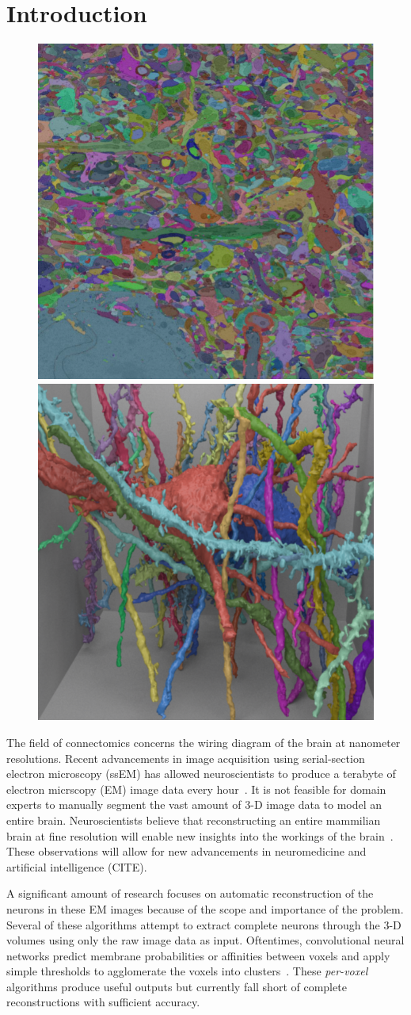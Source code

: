 \section{Introduction}

\begin{figure}
	\centering
	\includegraphics[width=0.42\linewidth]{./figures/intro-slice.png}
	\hspace{0.085\linewidth}
	\includegraphics[width=0.42\linewidth]{./figures/intro-cube.png}
\end{figure}

The field of connectomics concerns the wiring diagram of the brain at nanometer resolutions. 
Recent advancements in image acquisition using serial-section electron microscopy (ssEM) has allowed neuroscientists to produce a terabyte of electron micrscopy (EM) image data every hour~\cite{hildebrand2017whole}.
It is not feasible for domain experts to manually segment the vast amount of 3-D image data to model an entire brain.
Neuroscientists believe that reconstructing an entire mammilian brain at fine resolution will enable new insights into the workings of the brain~\cite{kasthuri2015saturated}. 
These observations will allow for new advancements in neuromedicine and artificial intelligence (CITE). 

A significant amount of research focuses on automatic reconstruction of the neurons in these EM images because of the scope and importance of the problem. 
Several of these algorithms attempt to extract complete neurons through the 3-D volumes using only the raw image data as input.
Oftentimes, convolutional neural networks predict membrane probabilities or affinities between voxels and apply simple thresholds to agglomerate the voxels into clusters~\cite{lee2015recursive,ronneberger2015u}.
These \textit{per-voxel} algorithms produce useful outputs but currently fall short of complete reconstructions with sufficient accuracy. 

